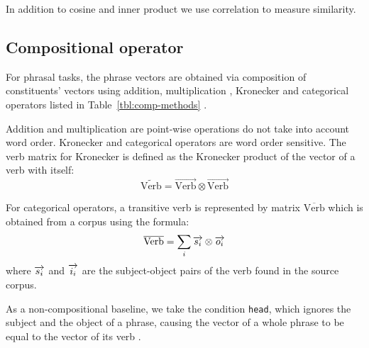 In addition to cosine and inner product we use correlation \cite{kiela-clark:2014:CVSC} to measure similarity.

\subsection{Compositional operator}
\label{sec:comp-oper}



For phrasal tasks, the phrase vectors are obtained via composition of constituents' vectors using addition, multiplication \cite{mitchell2010composition,mitchell-lapata:2008:ACLMain}, Kronecker \cite{Grefenstette:2011:ESC:2145432.2145580} and categorical operators listed in Table~\ref{tbl:comp-methods} \cite{milajevs-EtAl:2014:EMNLP2014,DBLP:journals/corr/abs-1003-4394}.

Addition and multiplication are point-wise operations do not take into account word order. Kronecker and categorical operators are word order sensitive. The verb matrix for Kronecker is defined as the Kronecker product of the vector of a verb with itself:
%
\begin{equation*}
  \widetilde{\text{Verb}} = \overrightarrow{\text{Verb}} \otimes \overrightarrow{\text{Verb}}
\end{equation*}

For categorical operators, a transitive verb is represented by matrix $\overline{\text{Verb}}$ which is obtained from a corpus using the formula:
$$
\overline{\text{Verb}} = \sum_i\overrightarrow{s_i} \otimes \overrightarrow{o_i}
$$
where $\overrightarrow{s_i}$ and $\overrightarrow{i_i}$ are the subject-object pairs of the verb found in the source corpus.

As a non-compositional baseline, we take the condition \texttt{head}, which ignores the subject and the object of a phrase, causing the vector of a whole phrase to be equal to the vector of its verb \cite{milajevs-EtAl:2014:EMNLP2014}.

